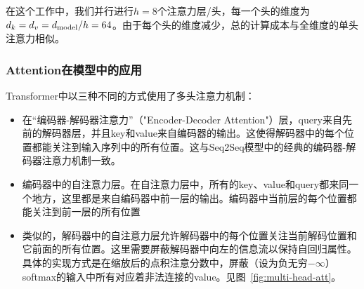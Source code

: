 在这个工作中，我们并行进行$h=8$个注意力层/头，每一个头的维度为$d_k=d_v=d_{\text{model}}/h=64$。由于每个头的维度减少，总的计算成本与全维度的单头注意力相似。

\subsubsection{Attention在模型中的应用}

Transformer中以三种不同的方式使用了多头注意力机制：
\begin{itemize}
 \item 在“编码器-解码器注意力”（"Encoder-Decoder Attention"）层，query来自先前的解码器层，并且key和value来自编码器的输出。这使得解码器中的每个位置都能关注到输入序列中的所有位置。这与Seq2Seq模型中的经典的编码器-解码器注意力机制一致\citep{wu2016google, bahdanau2014neural,JonasFaceNet2017}。

 \item 编码器中的自注意力层。在自注意力层中，所有的key、value和query都来同一个地方，这里都是来自编码器中前一层的输出。编码器中当前层的每个位置都能关注到前一层的所有位置

 \item 类似的，解码器中的自注意力层允许解码器中的每个位置关注当前解码位置和它前面的所有位置。这里需要屏蔽解码器中向左的信息流以保持自回归属性。具体的实现方式是在缩放后的点积注意分数中，屏蔽（设为负无穷$-\infty$）softmax的输入中所有对应着非法连接的value。见图~\ref{fig:multi-head-att}。

\end{itemize}

